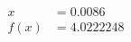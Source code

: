 \documentclass[preview]{standalone}
\begin{document}
\begin{align*}
x &= 0.0086\\f(x) &= 4.0222248
\end{align*}
\end{document}
